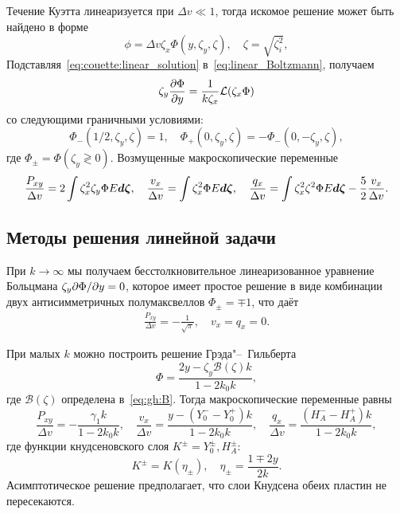 Течение Куэтта линеаризуется при \(\Delta{v}\ll 1\),
тогда искомое решение может быть найдено в форме
\begin{equation}\label{eq:couette:linear_solution}
    \phi = \Delta{v} \zeta_x \Phi(y,\zeta_y,\zeta), \quad \zeta = \sqrt{\zeta_i^2},
\end{equation}
Подставляя~\eqref{eq:couette:linear_solution} в~\eqref{eq:linear_Boltzmann}, получаем
\begin{equation}\label{eq:couette:linear_equation}
    \zeta_y \pder[\Phi]{y} = \frac1{k\zeta_x}\mathcal{L}(\zeta_x\Phi)
\end{equation}
со следующими граничными условиями:
\begin{equation}\label{eq:couette:linear_bc}
    \Phi_-(1/2,\zeta_y,\zeta) = 1, \quad \Phi_+(0,\zeta_y,\zeta) = -\Phi_-(0,-\zeta_y,\zeta),
\end{equation}
где \(\Phi_\pm = \Phi(\zeta_y \gtrless 0)\).
Возмущенные макроскопические переменные
\begin{equation}\label{eq:couette:linear_macro}
    \frac{P_{xy}}{\Delta{v}} = 2\int \zeta_x^2 \zeta_y \Phi E\dzeta, \quad
    \frac{v_x}{\Delta{v}} = \int \zeta_x^2 \Phi E\dzeta, \quad
    \frac{q_x}{\Delta{v}} = \int \zeta_x^2 \zeta^2 \Phi E\dzeta - \frac52 \frac{v_x}{\Delta{v}}.
\end{equation}

\subsection{Методы решения линейной задачи}

При \(k\to\infty\) мы получаем бесстолкновительное линеаризованное уравнение Больцмана \(\zeta_y\Pder[\Phi]{y} = 0\),
которое имеет простое решение в виде комбинации двух антисимметричных полумаксвеллов \(\Phi_\pm = \mp 1\), что даёт
\begin{gather}\label{eq:couette:linear_free_macro}
    \frac{P_{xy}}{\Delta{v}} = -\frac1{\sqrt{\pi}}, \quad v_x = q_x = 0.
\end{gather}

При малых \(k\) можно построить решение Грэда"--~Гильберта
\begin{equation}\label{eq:couette:small_solution}
    \Phi = \frac{2y - \zeta_y \mathcal{B}(\zeta) k}{1-2k_0k},
\end{equation}
где \(\mathcal{B}(\zeta)\) определена в~\eqref{eq:gh:B}.
Тогда макроскопические переменные равны
\begin{equation}\label{eq:couette:small_macro}
    \frac{P_{xy}}{\Delta{v}} = - \frac{\gamma_1 k}{1-2k_0k}, \quad
    \frac{v_x}{\Delta{v}} = \frac{y - (Y_0^--Y_0^+)k}{1-2k_0k}, \quad
    \frac{q_x}{\Delta{v}} = \frac{(H_A^--H_A^+)k}{1-2k_0k},
\end{equation}
где функции кнудсеновского слоя \(K^\pm = Y_0^\pm, H_A^\pm\):
\begin{equation}\label{eq:couette:linear_knudsen_functions}
     K^\pm = K(\eta_\pm), \quad \eta_\pm = \frac{1 \mp 2y}{2k}.
\end{equation}
Асимптотическое решение предполагает, что слои Кнудсена обеих пластин не пересекаются.

